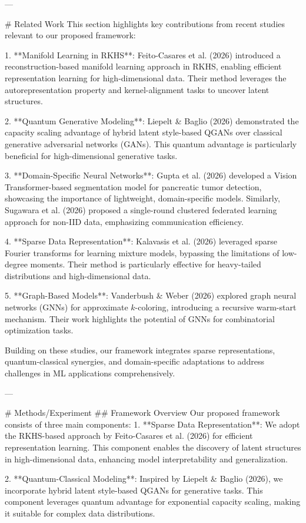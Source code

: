 ---

# Related Work  
This section highlights key contributions from recent studies relevant to our proposed framework:

1. **Manifold Learning in RKHS**: Feito-Casares et al. (2026) introduced a reconstruction-based manifold learning approach in RKHS, enabling efficient representation learning for high-dimensional data. Their method leverages the autorepresentation property and kernel-alignment tasks to uncover latent structures.

2. **Quantum Generative Modeling**: Liepelt & Baglio (2026) demonstrated the capacity scaling advantage of hybrid latent style-based QGANs over classical generative adversarial networks (GANs). This quantum advantage is particularly beneficial for high-dimensional generative tasks.

3. **Domain-Specific Neural Networks**: Gupta et al. (2026) developed a Vision Transformer-based segmentation model for pancreatic tumor detection, showcasing the importance of lightweight, domain-specific models. Similarly, Sugawara et al. (2026) proposed a single-round clustered federated learning approach for non-IID data, emphasizing communication efficiency.

4. **Sparse Data Representation**: Kalavasis et al. (2026) leveraged sparse Fourier transforms for learning mixture models, bypassing the limitations of low-degree moments. Their method is particularly effective for heavy-tailed distributions and high-dimensional data.

5. **Graph-Based Models**: Vanderbush & Weber (2026) explored graph neural networks (GNNs) for approximate $k$-coloring, introducing a recursive warm-start mechanism. Their work highlights the potential of GNNs for combinatorial optimization tasks.

Building on these studies, our framework integrates sparse representations, quantum-classical synergies, and domain-specific adaptations to address challenges in ML applications comprehensively.

---

# Methods/Experiment  
## Framework Overview  
Our proposed framework consists of three main components:  
1. **Sparse Data Representation**: We adopt the RKHS-based approach by Feito-Casares et al. (2026) for efficient representation learning. This component enables the discovery of latent structures in high-dimensional data, enhancing model interpretability and generalization.

2. **Quantum-Classical Modeling**: Inspired by Liepelt & Baglio (2026), we incorporate hybrid latent style-based QGANs for generative tasks. This component leverages quantum advantage for exponential capacity scaling, making it suitable for complex data distributions.

